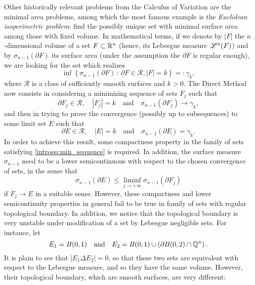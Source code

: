 Other historically relevant problems from the Calculus of Variation are the minimal area problems, among which the most famous example is the \emph{Euclidean isoperimetric problem}: find the possibly unique set with minimal surface area among those with fixed volume. In mathematical terms, if we denote by $|F|$ the $n$-dimensional volume of a set $F \subset \mathbb{R}^{n}$ (hence, its Lebesgue measure $\mathscr{L}^{n}(F)$) and by $\sigma_{n-1}(\partial F)$ its surface area (under the assumption the $\partial F$ is regular enough), we are looking for the set which realizes
\[
\inf \left\{\sigma_{n-1}(\partial F) \,:\, \partial F \in \mathcal{R}, |F| =
k \right\} =: \gamma_{k},
\]
where $\mathcal{R}$ is a class of sufficiently smooth surfaces and $k > 0$. The Direct Method now consists in considering a minimizing sequence of sets $F_{j}$ such that 
\begin{equation} \label{introeq:min_sequence}
\partial F_{j} \in \mathcal{R}, \quad |F_{j}| = k \quad \text{and} \quad \sigma_{n - 1}(\partial F_{j}) \to \gamma_{k},
\end{equation}
and then in trying to prove the convergence (possibly up to subsequences) to some limit set $E$ such that 
\begin{equation*}
\partial E \in \mathcal{R}, \quad |E| = k \quad \text{and} \quad \sigma_{n - 1}(\partial E) = \gamma_{k}.
\end{equation*}
In order to achieve this result, some compactness property in the family of sets satisfying \eqref{introeq:min_sequence} is required. In addition, the surface measure $\sigma_{n - 1}$ need to be a lower semicontinuous with respect to the chosen convergence of sets, in the sense that
\begin{equation*}
\sigma_{n - 1}(\partial E) \le \liminf_{j \to + \infty} \sigma_{n - 1}(\partial F_{j})
\end{equation*}
if $F_{j} \to E$ in a suitable sense.
However, these compactness and lower semicontinuity properties in general fail to be true in family of sets with regular topological boundary. In addition, we notice that the topological boundary is very unstable under modification of a set by Lebesgue negligible sets. For instance, let 
\begin{equation*}
E_{1} = B(0, 1) \quad \text{and} \quad E_{2} = B(0, 1) \cup \left ( \partial B(0, 2) \cap \mathbb{Q}^{n}\right ).
\end{equation*}
It is plain to see that $|E_{1} \Delta E_{2}| = 0$, so that these two sets are equivalent with respect to the Lebesgue measure, and so they have the same volume. However, their topological boundary, which are smooth surfaces, are very different:
